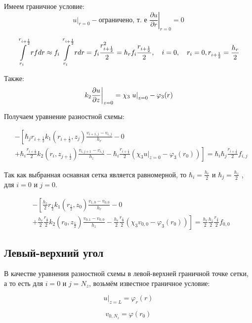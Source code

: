 Имеем граничное условие:
\[
  \left . u \right \vert_{r=0} - \text{ограничено, т. е } \left . \frac{\partial u}{ \partial r} \right |_{r = 0} = 0
\]

\[
  \int\limits^{r_{i+ \frac{1}{2}}}_{r_{i}} rf dr \approx f_i \int\limits^{r_{i + \frac{1}{2}}}_{r_{i}} r dr = 
  f_i \frac{r^2_{i + \frac{1}{2}}}{2} = h_r f_i \frac{r_{i + \frac{1}{2}}}{2},
  \quad i = 0, \quad r_i = 0, r_{i + \frac{1}{2}} = \frac{h_r}{2}
\]

Также:
\[
  \left . k_2 \pdv{u}{z} \right \vert_{z=0} = \chi_3 \left . u \right \vert_{z=0} - \varphi_3(r) 
\]

Получаем уравнение разностной схемы:

\begin{align*}
  &- \left [ 
  \hbar_j r_{i+\frac{1}{2}} k_1(r_{i+\frac{1}{2}}, z_j) \frac{v_{i+1, j} - v_{i, j}}{h_{r}}
  - 0
  \right . \\
  &\left .
  + \hbar_i \frac{r_{i + \frac{1}{2}}}{2} k_2(r_i, z_{j+\frac{1}{2}}) \frac{v_{i, j + 1} - v_{i, j}}{h_{z}}
  - \hbar_i \frac{r_{i + \frac{1}{2}}}{2} (\chi_3 \left . u \right \vert_{z=0} - \varphi_3(r_0))
  \right ]  = \hbar_i \hbar_j \frac{r_{i + \frac{1}{2}}}{2} f_{i, j}
\end{align*}

Так как выбранная оснавная сетка является равномерной, то $ \hbar_i = \frac{h_r}{2} $ и $ \hbar_j = \frac{h_z}{2}$
, для $ i = 0 $ и $ j = 0 $.

\begin{align*}
  &- \left [ 
  \frac{h_z}{2} r_{\frac{1}{2}} k_1(r_{\frac{1}{2}}, z_0) \frac{v_{1, 0} - v_{0, 0}}{h_{r}}
  - 0
  \right . \\
  &\left .
  + \frac{h_r}{2} \frac{r_{\frac{1}{2}}}{2} k_2(r_0, z_{\frac{1}{2}}) \frac{v_{0, 1} - v_{0, 0}}{h_{z}}
  - \frac{h_r}{2} \frac{r_{\frac{1}{2}}}{2} (\chi_3 v_{0, 0} - \varphi_3(r_0))
  \right ]  = \frac{h_r}{2} \frac{h_z}{2} \frac{r_{\frac{1}{2}}}{2} f_{0, 0}
\end{align*}

\subsection{Левый-верхний угол}

В качестве уравнения разностной схемы в левой-верхней граничной точке сетки, 
а то есть для $ i = 0 $ и $ j = N_z $, возьмём известное граничное условие:

\[
  \left . u \right \vert_{z=L} = \varphi_r(r) 
\]

\[
  v_{0,N_z} = \varphi(r_0)
\]

